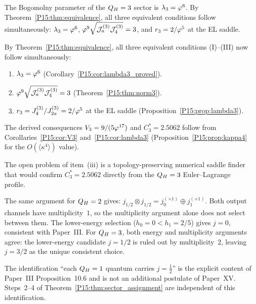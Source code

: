 \begin{corollary}[$\lam_3=\vp^6$: is closed]
\label{P15:cor:lambda3_proved}
The Bogomolny parameter of the $Q_H=3$ sector is $\lam_3=\vp^6$.
By Theorem~\ref{P15:thm:equivalence}, all three equivalent conditions
follow simultaneously: $\lam_3=\vp^6$, $\varphi^9\sqrt{\mathcal{J}_a^{(3)}\mathcal{J}_4^{(3)}}=3$,
and $r_3=2/\varphi^5$ at the EL saddle.
\end{corollary}

\begin{remark}
\label{P15:rem:three_conditions_summary}
By Theorem~\ref{P15:thm:equivalence}, all three equivalent
conditions (I)--(III) now follow simultaneously:
\begin{enumerate}[noitemsep,label=\textup{(\Roman*)}]
\item $\lam_3=\vp^6$ (Corollary~\ref{P15:cor:lambda3_proved}).
\item $\varphi^9\sqrt{\mathcal{J}_a^{(3)}\mathcal{J}_4^{(3)}}=3$ (Theorem~\ref{P15:thm:norm3}).
\item $r_3=J_4^{(3)}/J_{2a}^{(3)}=2/\varphi^5$ at the EL saddle
  (Proposition~\ref{P15:prop:lambda3}).
\end{enumerate}
The derived consequences $V_3=9/(5\varphi^{17})$ and $C_3^*=2.5062$
follow from Corollaries~\ref{P15:cor:V3} and~\ref{P15:cor:lambda3}
(Proposition~\ref{P15:prop:kappa4} for the $O(\langle\kappa^4\rangle)$ value).

The open problem of item~(iii) is a topology-preserving numerical saddle
finder that would confirm $C_3^*=2.5062$ directly
from the $Q_H=3$ Euler--Lagrange profile.
\end{remark}

\begin{remark}[The $\QH=2$ parallel]
\label{P15:rem:qh2_parallel}
The same argument for $\QH=2$ gives:
$j_{1/2}\otimes j_{1/2} = j_0^{(\times 1)}\oplus j_1^{(\times 1)}$.
Both output channels have multiplicity~$1$, so the multiplicity
argument alone does not select between them.
The lower-energy selection ($h_0=0 < h_1=2/5$) gives $j=0$,
consistent with Paper~III.
For $Q_H=3$, both energy and multiplicity arguments agree: the
lower-energy candidate $j=1/2$ is ruled out by multiplicity~$2$,
leaving $j=3/2$ as the unique consistent choice.
\end{remark}

\begin{remark}
\label{P15:rem:step1_status}
The identification ``each $Q_H=1$ quantum carries $j=\frac12$'' is the
explicit content of Paper~III Proposition~10.6 and is not an additional
postulate of Paper~XV. Steps~2--4 of Theorem~\ref{P15:thm:sector_assignment}
are independent of this identification.
\end{remark}

